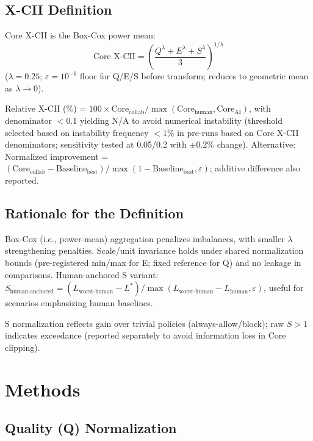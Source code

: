 \documentclass[a4paper]{article}
\begin{document}
\subsection{X-CII Definition}

Core X-CII is the Box-Cox power mean:
\[
\text{Core X-CII} = \left( \frac{Q^\lambda + E^\lambda + S^\lambda}{3} \right)^{1/\lambda}
\]
($\lambda=0.25$; $\varepsilon=10^{-6}$ floor for Q/E/S before transform; reduces to geometric mean as $\lambda\to0$).

Relative X-CII (\%) = $100 \times \text{Core}_{\text{collab}} / \max(\text{Core}_{\text{human}}, \text{Core}_{\text{AI}})$, with denominator $<0.1$ yielding N/A to avoid numerical instability (threshold selected based on instability frequency $<1\%$ in pre-runs based on Core X-CII denominators; sensitivity tested at 0.05/0.2 with $\pm0.2\%$ change). Alternative: Normalized improvement = $(\text{Core}_{\text{collab}} - \text{Baseline}_{\text{best}}) / \max(1 - \text{Baseline}_{\text{best}}, \varepsilon)$; additive difference also reported.

\subsection{Rationale for the Definition}

Box-Cox (i.e., power-mean) aggregation penalizes imbalances, with smaller $\lambda$ strengthening penalties. Scale/unit invariance holds under shared normalization bounds (pre-registered min/max for E; fixed reference for Q) and no leakage in comparisons. Human-anchored S variant: $S_{\text{human-anchored}} = (L_{\text{worst-human}} - L^*) / \max(L_{\text{worst-human}} - L_{\text{human}}, \varepsilon)$, useful for scenarios emphasizing human baselines.

S normalization reflects gain over trivial policies (always-allow/block); raw $S>1$ indicates exceedance (reported separately to avoid information loss in Core clipping).

\section{Methods}

\subsection{Quality (Q) Normalization}
\end{document}
